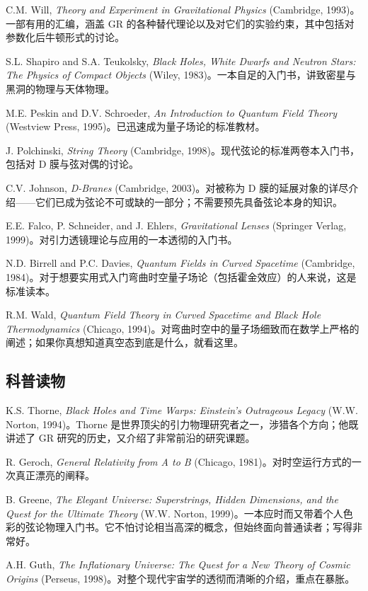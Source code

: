 C.M. Will, \emph{Theory and Experiment in Gravitational Physics} (Cambridge, 1993)。一部有用的汇编，涵盖 GR 的各种替代理论以及对它们的实验约束，其中包括对参数化后牛顿形式的讨论。

S.L. Shapiro and S.A. Teukolsky, \emph{Black Holes, White Dwarfs and Neutron Stars: The Physics of Compact Objects} (Wiley, 1983)。一本自足的入门书，讲致密星与黑洞的物理与天体物理。

M.E. Peskin and D.V. Schroeder, \emph{An Introduction to Quantum Field Theory} (Westview Press, 1995)。已迅速成为量子场论的标准教材。

J. Polchinski, \emph{String Theory} (Cambridge, 1998)。现代弦论的标准两卷本入门书，包括对 D 膜与弦对偶的讨论。

C.V. Johnson, \emph{D-Branes} (Cambridge, 2003)。对被称为 D 膜的延展对象的详尽介绍——它们已成为弦论不可或缺的一部分；不需要预先具备弦论本身的知识。

E.E. Falco, P. Schneider, and J. Ehlers, \emph{Gravitational Lenses} (Springer Verlag, 1999)。对引力透镜理论与应用的一本透彻的入门书。

N.D. Birrell and P.C. Davies, \emph{Quantum Fields in Curved Spacetime} (Cambridge, 1984)。对于想要实用式入门弯曲时空量子场论（包括霍金效应）的人来说，这是标准读本。

R.M. Wald, \emph{Quantum Field Theory in Curved Spacetime and Black Hole Thermodynamics} (Chicago, 1994)。对弯曲时空中的量子场细致而在数学上严格的阐述；如果你真想知道真空态到底是什么，就看这里。

\subsection*{科普读物}

K.S. Thorne, \emph{Black Holes and Time Warps: Einstein's Outrageous Legacy} (W.W. Norton, 1994)。Thorne 是世界顶尖的引力物理研究者之一，涉猎各个方向；他既讲述了 GR 研究的历史，又介绍了非常前沿的研究课题。

R. Geroch, \emph{General Relativity from A to B} (Chicago, 1981)。对时空运行方式的一次真正漂亮的阐释。

B. Greene, \emph{The Elegant Universe: Superstrings, Hidden Dimensions, and the Quest for the Ultimate Theory} (W.W. Norton, 1999)。一本应时而又带着个人色彩的弦论物理入门书。它不怕讨论相当高深的概念，但始终面向普通读者；写得非常好。

A.H. Guth, \emph{The Inflationary Universe: The Quest for a New Theory of Cosmic Origins} (Perseus, 1998)。对整个现代宇宙学的透彻而清晰的介绍，重点在暴胀。

